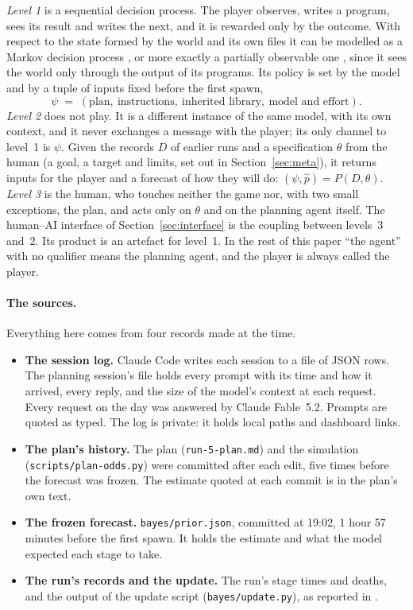 \documentclass[11pt,a4paper]{article}
\begin{document}
\emph{Level 1} is a sequential decision process. The player observes, writes a program, sees its result and writes the next, and it is rewarded only by the outcome. With respect to the state formed by the world and its own files it can be modelled as a Markov decision process \citep{sutton2018}, or more exactly a partially observable one \citep{kaelbling1998}, since it sees the world only through the output of its programs. Its policy is set by the model and by a tuple of inputs fixed before the first spawn,
\[
\psi \;=\; (\mbox{plan},\ \mbox{instructions},\ \mbox{inherited library},\ \mbox{model and effort}).
\]
\emph{Level 2} does not play. It is a different instance of the same model, with its own context, and it never exchanges a message with the player; its only channel to level~1 is $\psi$. Given the records $D$ of earlier runs and a specification $\theta$ from the human (a goal, a target and limits, set out in Section~\ref{sec:meta}), it returns inputs for the player and a forecast of how they will do: $(\psi, \hat p) = P(D, \theta)$. \emph{Level 3} is the human, who touches neither the game nor, with two small exceptions, the plan, and acts only on $\theta$ and on the planning agent itself. The human--AI interface of Section~\ref{sec:interface} is the coupling between levels~3 and~2. Its product is an artefact for level~1. In the rest of this paper ``the agent'' with no qualifier means the planning agent, and the player is always called the player.

\paragraph{The sources.} Everything here comes from four records made at the time.
\begin{itemize}
\item \textbf{The session log.} Claude Code writes each session to a file of JSON rows. The planning session's file holds every prompt with its time and how it arrived, every reply, and the size of the model's context at each request. Every request on the day was answered by Claude Fable~5.2. Prompts are quoted as typed. The log is private: it holds local paths and dashboard links.
\item \textbf{The plan's history.} The plan (\texttt{run-5-plan.md}) and the simulation (\texttt{scripts/plan-odds.py}) were committed after each edit, five times before the forecast was frozen. The estimate quoted at each commit is in the plan's own text.
\item \textbf{The frozen forecast.} \texttt{bayes/prior.json}, committed at 19:02, 1 hour 57 minutes before the first spawn. It holds the estimate and what the model expected each stage to take.
\item \textbf{The run's records and the update.} The run's stage times and deaths, and the output of the update script (\texttt{bayes/update.py}), as reported in \citet{batsuk2026fifth}.
\end{itemize}
\end{document}
